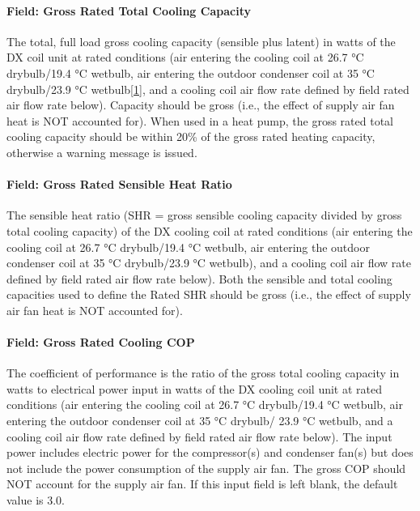 \paragraph{Field: Gross Rated Total Cooling Capacity}\label{field-gross-rated-total-cooling-capacity-1}

The total, full load gross cooling capacity (sensible plus latent) in watts of the DX coil unit at rated conditions (air entering the cooling coil at 26.7 °C drybulb/19.4 °C wetbulb, air entering the outdoor condenser coil at 35 °C drybulb/23.9 °C wetbulb\protect\hyperlink{ux5fftn1}{{[}1{]}}, and a cooling coil air flow rate defined by field rated air flow rate below). Capacity should be gross (i.e., the effect of supply air fan heat is NOT accounted for). When used in a heat pump, the gross rated total cooling capacity should be within 20\% of the gross rated heating capacity, otherwise a warning message is issued.

\paragraph{Field: Gross Rated Sensible Heat Ratio}\label{field-gross-rated-sensible-heat-ratio}

The sensible heat ratio (SHR = gross sensible cooling capacity divided by gross total cooling capacity) of the DX cooling coil at rated conditions (air entering the cooling coil at 26.7 °C drybulb/19.4 °C wetbulb, air entering the outdoor condenser coil at 35 °C drybulb/23.9 °C wetbulb), and a cooling coil air flow rate defined by field rated air flow rate below). Both the sensible and total cooling capacities used to define the Rated SHR should be gross (i.e., the effect of supply air fan heat is NOT accounted for).

\paragraph{Field: Gross Rated Cooling COP}\label{field-gross-rated-cooling-cop}

The coefficient of performance is the ratio of the gross total cooling capacity in watts to electrical power input in watts of the DX cooling coil unit at rated conditions (air entering the cooling coil at 26.7 °C drybulb/19.4 °C wetbulb, air entering the outdoor condenser coil at 35 °C drybulb/ 23.9 °C wetbulb, and a cooling coil air flow rate defined by field rated air flow rate below). The input power includes electric power for the compressor(s) and condenser fan(s) but does not include the power consumption of the supply air fan. The gross COP should NOT account for the supply air fan. If this input field is left blank, the default value is 3.0.

